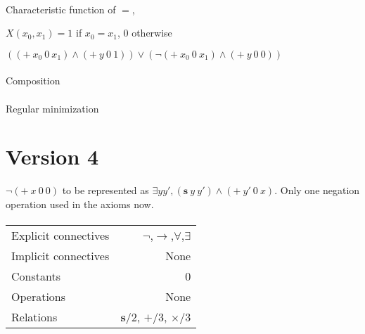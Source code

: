 \documentclass{article}
\begin{document}
\paragraph{}
Characteristic function of $=$,

$X(x_{0},x_{1}) = 1$ if $x_{0} = x_{1}$, $0$ otherwise


$((+\ x_{0}\ 0\ x_{1}) \land (+\ y\ 0\ 1)) \lor (\neg(+\ x_{0}\ 0\ x_{1}) \land (+\ y\ 0\ 0))$


\paragraph{}
Composition

\paragraph{}
Regular minimization

\newpage
\section{Version 4}

$\neg(+\ x\ 0\ 0)$ to be represented as $\exists y y', (\mathbf{s}\ y\ y') \land (+\ y'\ 0\ x)$. Only one negation operation used in the axioms now. 

\paragraph{}
\begin{tabular}{l | r}
 \hline
 Explicit connectives & $\neg$,$\rightarrow $,$\forall$,$\exists$ \\
 Implicit connectives & None \\
 Constants & 0 \\
 Operations & None \\
 Relations & $\mathbf{s}$/2, $+$/3, $\times$/3\\
 \hline
\end{tabular}
\end{document}
